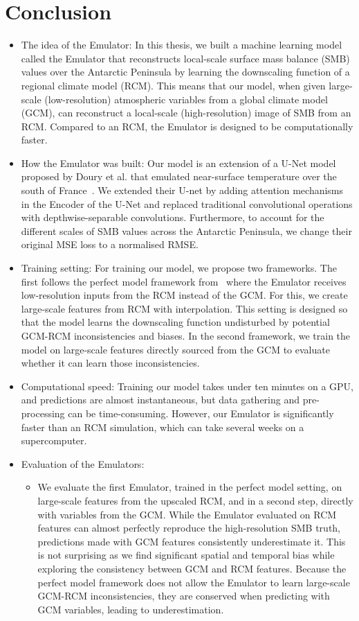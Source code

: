 \documentclass[a4paper,11pt,oneside]{report}
\begin{document}
\chapter{Conclusion}
\begin{itemize}
    \item The idea of the Emulator: In this thesis, we built a machine learning model called the Emulator that reconstructs local-scale surface mass balance (SMB) values over the Antarctic Peninsula by learning the downscaling function of a regional climate model (RCM). This means that our model, when given large-scale (low-resolution) atmospheric variables from a global climate model (GCM), can reconstruct a local-scale (high-resolution) image of SMB from an RCM. Compared to an RCM, the Emulator is designed to be computationally faster.   
    \item How the Emulator was built: Our model is an extension of a U-Net model proposed by Doury et al. that emulated near-surface temperature over the south of France~\cite{Doury}. We extended their U-net by adding attention mechanisms in the Encoder of the U-Net and replaced traditional convolutional operations with depthwise-separable convolutions. Furthermore, to account for the different scales of SMB values across the Antarctic Peninsula, we change their original MSE loss to a normalised RMSE. 
    \item Training setting: For training our model, we propose two frameworks. The first follows the perfect model framework from~\cite{Doury} where the Emulator receives low-resolution inputs from the RCM instead of the GCM. For this, we create large-scale features from RCM with interpolation. This setting is designed so that the model learns the downscaling function undisturbed by potential GCM-RCM inconsistencies and biases. In the second framework, we train the model on large-scale features directly sourced from the GCM to evaluate whether it can learn those inconsistencies. 
    \item Computational speed: Training our model takes under ten minutes on a GPU, and predictions are almost instantaneous, but data gathering and pre-processing can be time-consuming. However, our Emulator is significantly faster than an RCM simulation, which can take several weeks on a supercomputer. 
    \item Evaluation of the Emulators:
    \begin{itemize}
        \item We evaluate the first Emulator, trained in the perfect model setting, on large-scale features from the upscaled RCM, and in a second step, directly with variables from the GCM. While the Emulator evaluated on RCM features can almost perfectly reproduce the high-resolution SMB truth, predictions made with GCM features consistently underestimate it. This is not surprising as we find significant spatial and temporal bias while exploring the consistency between GCM and RCM features. Because the perfect model framework does not allow the Emulator to learn large-scale GCM-RCM inconsistencies, they are conserved when predicting with GCM variables, leading to underestimation. 

\end{itemize}
\end{itemize}
\end{document}
